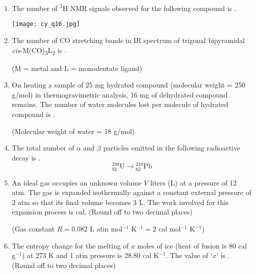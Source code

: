 \documentclass[12pt]{article}
\begin{document}
\begin{enumerate}[label=Q.\arabic*]
			\item The number of \textsuperscript{1}H NMR signals observed for the following compound is \underline{\hspace{2cm}}.
			\begin{center}
			\texttt{[image: cy\_q16.jpg]}
			\end{center}

			\item The number of CO stretching bands in IR spectrum of trigonal bipyramidal \textit{cis}-M(CO)\textsubscript{3}L\textsubscript{2} is \underline{\hspace{2cm}}.

			\begin{flushleft}
(M = metal and L = monodentate ligand)
	\end{flushleft}

	\item On heating a sample of 25 mg hydrated compound (molecular weight = 250 g/mol) in thermogravimetric analysis, 16 mg of dehydrated compound remains. The number of water molecules lost per molecule of hydrated compound is \underline{\hspace{2cm}}.

	\begin{flushleft}
(Molecular weight of water = 18 g/mol)
	\end{flushleft}

	\item The total number of $\alpha$ and $\beta$ particles emitted in the following radioactive decay is \underline{\hspace{2cm}}.
	\[
{}^{238}_{92}\mathrm{U} \longrightarrow {}^{210}_{82}\mathrm{Pb}
	\]
\item An ideal gas occupies an unknown volume $V$ liters (L) at a pressure of 12 atm. The gas is expanded isothermally against a constant external pressure of 2 atm so that its final volume becomes 3 L. The work involved for this expansion process is \underline{\hspace{2cm}} cal. (Round off to two decimal places)

	\begin{flushleft}
(Gas constant $R = 0.082$ L atm mol$^{-1}$ K$^{-1} = 2$ cal mol$^{-1}$ K$^{-1}$)
	\end{flushleft}

\item The entropy change for the melting of $x$ moles of ice (heat of fusion is 80 cal g$^{-1}$) at 273 K and 1 atm pressure is 28.80 cal K$^{-1}$. The value of ‘$x$’ is \underline{\hspace{2cm}}. (Round off to two decimal places)


\end{enumerate}
\end{document}
